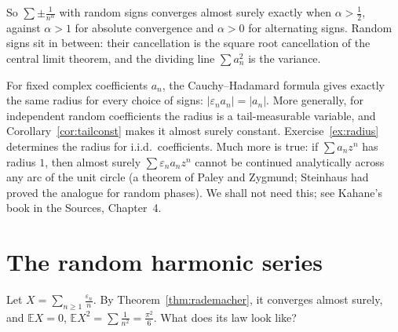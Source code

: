 So $\sum\pm\frac1{n^\alpha}$ with random signs converges almost surely exactly when $\alpha>\frac12$, against $\alpha>1$ for
absolute convergence and $\alpha>0$ for alternating signs. Random signs sit in between: their cancellation is the square
root cancellation of the central limit theorem, and the dividing line $\sum a_n^2$ is the variance.

\begin{remark}
For fixed complex coefficients $a_n$, the Cauchy--Hadamard formula gives exactly the same radius for every choice of signs: $|\varepsilon_n a_n|=|a_n|$. More generally, for independent random coefficients the radius is a tail-measurable variable, and Corollary~\ref{cor:tailconst} makes it almost surely constant. Exercise~\ref{ex:radius} determines the radius for i.i.d.\ coefficients.
Much more is true: if $\sum a_nz^n$ has radius $1$, then almost surely $\sum\varepsilon_na_nz^n$ cannot be continued analytically
across any arc of the unit circle (a theorem of Paley and Zygmund; Steinhaus had proved the analogue for random phases). We shall not need this; see
Kahane's book in the Sources, Chapter~4.
\end{remark}

\section{The random harmonic series}

Let $X=\sum_{n\ge1}\frac{\varepsilon_n}n$. By Theorem~\ref{thm:rademacher}, it converges almost surely, and $\mathbb E X=0$,
$\mathbb E X^2=\sum\frac1{n^2}=\frac{\pi^2}6$. What does its law look like?


